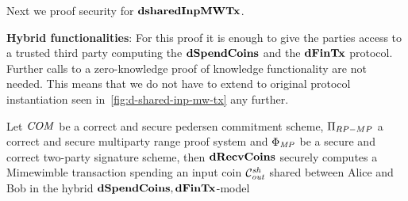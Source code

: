 Next we proof security for $\mathbf{dsharedInpMWTx}$.

\textbf{Hybrid functionalities}: For this proof it is enough to give the parties access to a trusted third party computing the $\mathbf{dSpendCoins}$ and the $\mathbf{dFinTx}$ protocol.
Further calls to a zero-knowledge proof of knowledge functionality are not needed.
This means that we do not have to extend to original protocol instantiation seen in~\cref{fig:d-shared-inp-mw-tx} any further.

\begin{theorem} \label{teo:atom:sec-dshared-inp}
    Let $\mathit{COM}$ be a correct and secure pedersen commitment scheme, $\Pi_{RP-MP}$ a correct and secure multiparty range proof system and $\Phi_{\mathit{MP}}$ be a secure and correct two-party signature scheme, then $\mathbf{dRecvCoins}$ securely computes a Mimewimble transaction spending an input coin $\mathcal{C}_{\mathit{out}}^{\mathit{sh}}$ shared between Alice and Bob in the hybrid $\mathbf{dSpendCoins},\mathbf{dFinTx}$-model
\end{theorem}

